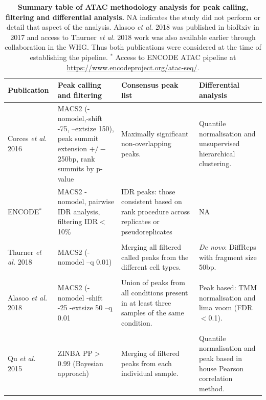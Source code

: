 \begin{landscape}
\begin{center}
\renewcommand{\arraystretch}{0.7}	
\begin{longtable}[ht]{p{.20\textheight} p{.40\textheight} p{.40\textheight} p{.40\textheight}}
\caption[Summary table of ATAC analysis methodology for peak calling, filtering and differential analysis.]{\textbf{Summary table of ATAC methodology analysis for peak calling, filtering and differential analysis.} NA indicates the study did not perform or detail that aspect of the analysis. Alasoo \textit{et al.} 2018 was published in bioRxiv in 2017 and access to Thurner \textit{et al.} 2018 work was also available earlier through collaboration in the WHG. Thus both publications were considered at the time of establishing the pipeline. $^{\ast}$ Access to ENCODE ATAC pipeline at \url{https://www.encodeproject.org/atac-seq/}.}
\label{tab:ATAC_comparative_methods} \\
\toprule
\textbf{Publication} & \textbf{Peak calling and filtering} & \textbf{Consensus peak list} & \textbf{Differential analysis} \\
\midrule
\midrule
Corces \textit{et al.} 2016 & MACS2 (-nomodel,-shift -75, --extsize 150), peak summit extension $+/-$250bp, rank summits by p-value & Maximally significant non-overlapping peaks. & Quantile normalisation and unsupervised hierarchical clustering. \\
ENCODE$^{\ast}$  & MACS2 -nomodel, pairwise IDR analysis, filtering IDR$<$10\% & IDR peaks: those consistent based on rank procedure across replicates or pseudoreplicates & NA \\   
 &&&\\        
Thurner \textit{et al.} 2018 	& MACS2 (-nomodel --q 0.01) & Merging all filtered called peaks from the different cell types. & \textit{De novo}: DiffReps with fragment size 50bp. \\             																																						
 &&&\\  
Alasoo \textit{et al.} 2018 & MACS2 (-nomodel -shift -25 -extsize 50 --q 0.01 &	Union of peaks from all conditions present in at least three samples of the same condition. & Peak based: TMM normalisation and lima voom (FDR$<$0.1).\\ 
 &&&\\  
Qu \textit{et al.} 2015 & ZINBA PP$>$0.99 (Bayesian approach) & Merging of filtered peaks from each individual sample. & Quantile normalisation and peak based in house Pearson correlation method. \\	

\end{longtable}
\end{center}
\end{landscape}
